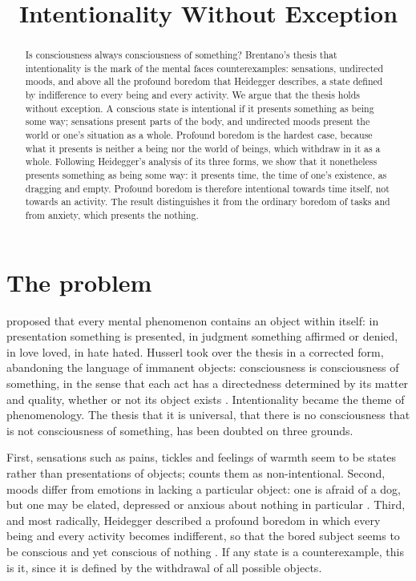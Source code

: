 \documentclass{situationist-preprint}
\title{Intentionality Without Exception}
\begin{document}
\maketitle

\begin{abstract}
Is consciousness always consciousness of something? Brentano's thesis that intentionality is the mark of the mental faces counterexamples: sensations, undirected moods, and above all the profound boredom that Heidegger describes, a state defined by indifference to every being and every activity. We argue that the thesis holds without exception. A conscious state is intentional if it presents something as being some way; sensations present parts of the body, and undirected moods present the world or one's situation as a whole. Profound boredom is the hardest case, because what it presents is neither a being nor the world of beings, which withdraw in it as a whole. Following Heidegger's analysis of its three forms, we show that it nonetheless presents something as being some way: it presents time, the time of one's existence, as dragging and empty. Profound boredom is therefore intentional towards time itself, not towards an activity. The result distinguishes it from the ordinary boredom of tasks and from anxiety, which presents the nothing.
\end{abstract}

\section{The problem}

\citet[bk.~II, ch.~1]{Brentano1874} proposed that every mental phenomenon contains an object within itself: in presentation something is presented, in judgment something affirmed or denied, in love loved, in hate hated. Husserl took over the thesis in a corrected form, abandoning the language of immanent objects: consciousness is consciousness of something, in the sense that each act has a directedness determined by its matter and quality, whether or not its object exists \citep[V]{Husserl1901}. Intentionality became the theme of phenomenology. The thesis that it is universal, that there is no consciousness that is not consciousness of something, has been doubted on three grounds.

First, sensations such as pains, tickles and feelings of warmth seem to be states rather than presentations of objects; \citet{Searle1983} counts them as non-intentional. Second, moods differ from emotions in lacking a particular object: one is afraid of a dog, but one may be elated, depressed or anxious about nothing in particular \citep{Searle1983, Goldie2000}. Third, and most radically, Heidegger described a profound boredom in which every being and every activity becomes indifferent, so that the bored subject seems to be conscious and yet conscious of nothing \citep[\S\S 18--38]{Heidegger1995}. If any state is a counterexample, this is it, since it is defined by the withdrawal of all possible objects.
\end{document}
